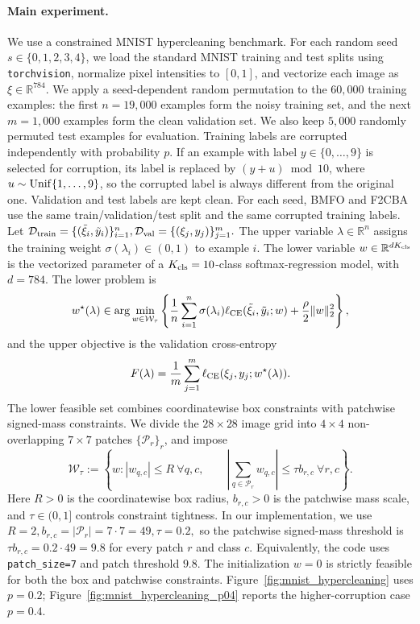 \documentclass{article}
\begin{document}
\paragraph{Main experiment.}
We use a constrained MNIST hypercleaning benchmark. For each random seed
\(s\in\{0,1,2,3,4\}\), we load the standard MNIST training and test splits using
\texttt{torchvision}, normalize pixel intensities to \([0,1]\), and vectorize each image as
\(\xi\in\mathbb R^{784}\). We apply a seed-dependent random permutation to the \(60{,}000\)
training examples: the first \(n=19{,}000\) examples form the noisy training set, and the next
\(m=1{,}000\) examples form the clean validation set. We also keep \(5{,}000\) randomly permuted
test examples for evaluation. Training labels are corrupted independently with probability \(p\). If an example with label
\(y\in\{0,\ldots,9\}\) is selected for corruption, its label is replaced by
\((y+u)\bmod 10\), where \(u\sim{\rm Unif}\{1,\ldots,9\}\), so the corrupted label is always
different from the original one. Validation and test labels are kept clean. For each seed, BMFO and
F2CBA use the same train/validation/test split and the same corrupted training labels. Let
\( \mathcal D_{\rm train}=\{(\tilde\xi_i,\tilde y_i)\}_{i=1}^n,
\mathcal D_{\rm val}=\{(\xi_j,y_j)\}_{j=1}^m .
\) The upper variable \(\lambda\in\mathbb R^n\) assigns the training weight
\(\sigma(\lambda_i)\in(0,1)\) to example \(i\). The lower variable
\(w\in\mathbb R^{dK_{\rm cls}}\) is the vectorized parameter of a
\(K_{\rm cls}=10\)-class softmax-regression model, with \(d=784\). The lower problem is
\[
w^\star(\lambda)\in
\arg\min_{w\in\mathcal W_\tau}
\left\{
\frac1n\sum_{i=1}^n
\sigma(\lambda_i)\ell_{\rm CE}(\tilde\xi_i,\tilde y_i;w)
+
\frac{\rho}{2}\|w\|_2^2
\right\},
\]
and the upper objective is the validation cross-entropy
\[
F(\lambda)
=
\frac1m\sum_{j=1}^m
\ell_{\rm CE}(\xi_j,y_j;w^\star(\lambda)).
\]
The lower feasible set combines coordinatewise box constraints with patchwise signed-mass
constraints. We divide the \(28\times28\) image grid into \(4\times4\) non-overlapping
\(7\times7\) patches \(\{\mathcal P_r\}_r\), and impose
\[
\mathcal W_\tau
:=
\left\{
w:
|w_{q,c}|\le R\ \forall q,c,\qquad
\left|\sum_{q\in\mathcal P_r}w_{q,c}\right|
\le \tau b_{r,c}\ \forall r,c
\right\}.
\]
Here \(R>0\) is the coordinatewise box radius, \(b_{r,c}>0\) is the patchwise mass scale, and
\(\tau\in(0,1]\) controls constraint tightness. In our implementation, we use
\(
R=2, b_{r,c}=|\mathcal P_r|=7\cdot7=49,\tau=0.2,
\) so the patchwise signed-mass threshold is
\(
\tau b_{r,c}=0.2\cdot49=9.8 \)
for every patch \(r\) and class \(c\). Equivalently, the code uses
\texttt{patch\_size=7} and patch threshold \(9.8\). The initialization \(w=0\) is strictly feasible
for both the box and patchwise constraints. Figure~\ref{fig:mnist_hypercleaning} uses \(p=0.2\);
Figure~\ref{fig:mnist_hypercleaning_p04} reports the higher-corruption case \(p=0.4\).
\end{document}

